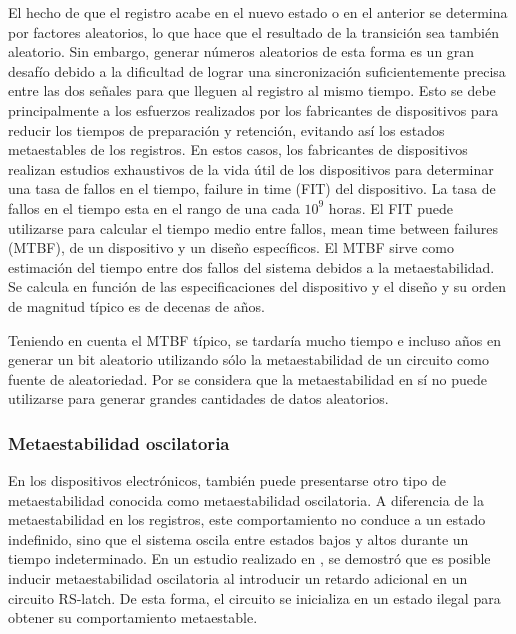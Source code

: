                 El hecho de que el registro acabe en el nuevo estado o en el anterior se determina por factores aleatorios, lo que hace que el resultado de la transición sea también aleatorio. Sin embargo, generar números aleatorios de esta forma es un gran desafío debido a la dificultad de lograr una sincronización suficientemente precisa entre las dos señales para que lleguen al registro al mismo tiempo. Esto se debe principalmente a los esfuerzos realizados por los fabricantes de dispositivos para reducir los tiempos de preparación y retención, evitando así los estados metaestables de los registros. En estos casos, los fabricantes de dispositivos realizan estudios exhaustivos de la vida útil de los dispositivos para determinar una tasa de fallos en el tiempo, failure in time (FIT) del dispositivo. La tasa de fallos en el tiempo esta en el rango de una cada $10^{9}$ horas. El FIT puede utilizarse para calcular el tiempo medio entre fallos, mean time between failures (MTBF), de un dispositivo y un diseño específicos. El MTBF sirve como estimación del tiempo entre dos fallos del sistema debidos a la metaestabilidad. Se calcula en función de las especificaciones del dispositivo y el diseño y su orden de magnitud típico es de decenas de años.

                Teniendo en cuenta el MTBF típico, se tardaría mucho tiempo e incluso años en generar un bit aleatorio utilizando sólo la metaestabilidad de un circuito como fuente de aleatoriedad. Por se considera que la metaestabilidad en sí no puede utilizarse para generar grandes cantidades de datos aleatorios.

            \subsubsection{Metaestabilidad oscilatoria}

                  En los dispositivos electrónicos, también puede presentarse otro tipo de metaestabilidad conocida como metaestabilidad oscilatoria. A diferencia de la metaestabilidad en los registros, este comportamiento no conduce a un estado indefinido, sino que el sistema oscila entre estados bajos y altos durante un tiempo indeterminado. En un estudio realizado en \cite{Reyneri1990}, se demostró que es posible inducir metaestabilidad oscilatoria al introducir un retardo adicional en un circuito RS-latch. De esta forma, el circuito se inicializa en un estado ilegal para obtener su comportamiento metaestable.
                        
